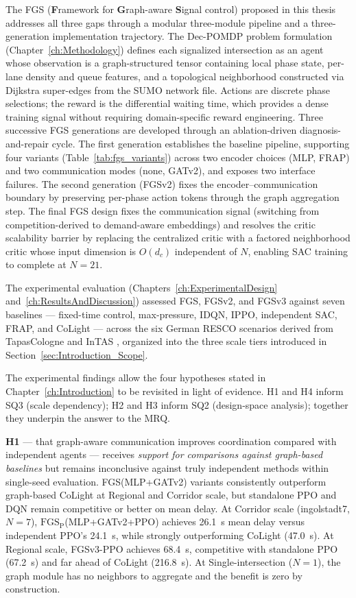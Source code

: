 The FGS (\textbf{F}ramework for \textbf{G}raph-aware \textbf{S}ignal control) proposed in this thesis addresses all three gaps through a modular three-module pipeline and a three-generation implementation trajectory. The Dec-POMDP problem formulation (Chapter~\ref{ch:Methodology}) defines each signalized intersection as an agent whose observation is a graph-structured tensor containing local phase state, per-lane density and queue features, and a topological neighborhood constructed via Dijkstra super-edges from the SUMO network file. Actions are discrete phase selections; the reward is the differential waiting time, which provides a dense training signal without requiring domain-specific reward engineering. Three successive FGS generations are developed through an ablation-driven diagnosis-and-repair cycle. The first generation establishes the baseline pipeline, supporting four variants (Table~\ref{tab:fgs_variants}) across two encoder choices (MLP, FRAP) and two communication modes (none, GATv2), and exposes two interface failures. The second generation (FGSv2) fixes the encoder--communication boundary by preserving per-phase action tokens through the graph aggregation step. The final FGS design fixes the communication signal (switching from competition-derived to demand-aware embeddings) and resolves the critic scalability barrier by replacing the centralized critic with a factored neighborhood critic whose input dimension is $O(d_c)$ independent of $N$, enabling SAC training to complete at $N=21$.

The experimental evaluation (Chapters~\ref{ch:ExperimentalDesign} and~\ref{ch:ResultsAndDiscussion}) assessed FGS, FGSv2, and FGSv3 against seven baselines — fixed-time control, max-pressure, IDQN, IPPO, independent SAC, FRAP, and CoLight — across the six German RESCO scenarios derived from TapasCologne \citep{tapascologne} and InTAS \citep{intasscenario}, organized into the three scale tiers introduced in Section~\ref{sec:Introduction_Scope}.

The experimental findings allow the four hypotheses stated in Chapter~\ref{ch:Introduction} to be revisited in light of evidence. H1 and H4 inform SQ3 (scale dependency); H2 and H3 inform SQ2 (design-space analysis); together they underpin the answer to the MRQ.

\textbf{H1} — that graph-aware communication improves coordination compared with independent agents — receives \textit{support for comparisons against graph-based baselines} but remains inconclusive against truly independent methods within single-seed evaluation. FGS(MLP+GATv2) variants consistently outperform graph-based CoLight at Regional and Corridor scale, but standalone PPO and DQN remain competitive or better on mean delay. At Corridor scale (ingolstadt7, $N=7$), $\text{FGS}_\text{P}$(MLP+GATv2+PPO) achieves 26.1~s mean delay versus independent PPO's 24.1~s, while strongly outperforming CoLight (47.0~s). At Regional scale, FGSv3-PPO achieves 68.4~s, competitive with standalone PPO (67.2~s) and far ahead of CoLight (216.8~s). At Single-intersection ($N=1$), the graph module has no neighbors to aggregate and the benefit is zero by construction.

